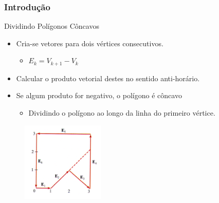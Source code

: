 \documentclass{beamer}
\begin{document}
\begin{frame}
\frametitle{Introdução}

		\begin{block}{Dividindo Polígonos Côncavos}
		\begin{itemize}
			\item Cria-se vetores para dois vértices consecutivos.
				\begin{itemize}
					\item $E_k = V_{k+1} - V_k$
				\end{itemize}
			\item Calcular o produto vetorial destes no sentido anti-horário.
			\item Se algum produto for negativo, o polígono é côncavo
				\begin{itemize}
					\item Dividindo o polígono ao longo da linha do primeiro vértice.
				\end{itemize}
		\end{itemize}
		\end{block}
		
		\begin{figure}[!h]
			\begin{center}
				\includegraphics[width=0.35\textwidth]{Figures/PolConVexDiv}
			\end{center}
		\end{figure}
	
\end{frame}
\end{document}
